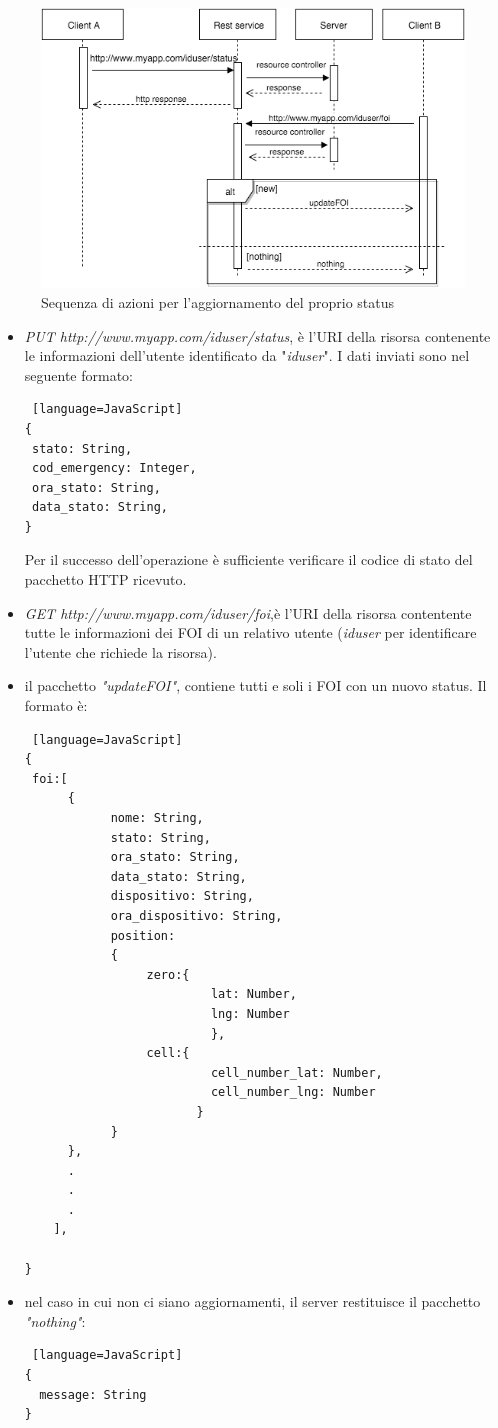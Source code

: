  \begin{figure}[H]
	\centering
	\includegraphics[scale=0.8]{Implementazione/updateStatus.png}
	\caption{Sequenza di azioni per l'aggiornamento del proprio status }
	\label{fig:rest}
\end{figure}
\begin{itemize}
\item \textit{PUT http://www.myapp.com/iduser/status}, è l'URI della risorsa contenente le informazioni dell'utente identificato da "\textit{iduser}". I dati inviati sono nel seguente formato:
\begin{lstlisting} [language=JavaScript]
{
 stato: String,
 cod_emergency: Integer,
 ora_stato: String,
 data_stato: String,
}
\end{lstlisting}
Per il successo dell'operazione è sufficiente verificare il codice di stato del pacchetto HTTP ricevuto.
\item \textit{GET http://www.myapp.com/iduser/foi},è l'URI della risorsa contentente tutte le informazioni dei FOI di un relativo utente (\textit{iduser} per identificare l'utente che richiede la risorsa).
\item il pacchetto \textit{"updateFOI"}, contiene tutti e soli i FOI con un nuovo status. Il formato è:
\begin{lstlisting} [language=JavaScript]
{
 foi:[
	  {
			nome: String,
			stato: String,
			ora_stato: String,
			data_stato: String,
			dispositivo: String,
			ora_dispositivo: String,
			position: 
			{
			     zero:{
			              lat: Number,
			              lng: Number
			              },
			     cell:{
			              cell_number_lat: Number,
			              cell_number_lng: Number
			            }
			}
	  },
	  .
	  .
	  .
	],
  
}
\end{lstlisting}
\item nel caso in cui non ci siano aggiornamenti, il server restituisce il pacchetto \textit{"nothing"}:
\begin{lstlisting} [language=JavaScript]
{
  message: String
}
\end{lstlisting}
\end{itemize}

